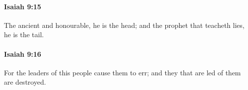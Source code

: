 		\paragraph{Isaiah 9:15} %
			\label{ISAIAH-9-15}

			The ancient and honourable, he is the head; and the prophet that teacheth lies, he is the tail.


		\paragraph{Isaiah 9:16} %
			\label{ISAIAH-9-16}

			For the leaders of this people cause them to err; and they that are led of them are destroyed.


